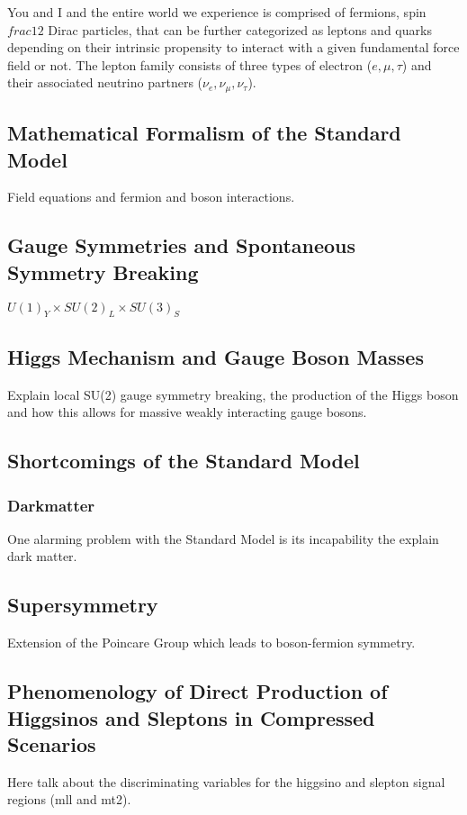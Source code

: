 \documentclass[11pt, oneside]{article}   	%
\begin{document}
You and I and the entire world we experience is comprised of fermions, spin $frac{1}{2}$ Dirac particles, that can be further categorized as leptons and quarks depending on their intrinsic propensity to interact with a given fundamental force field or not.  The lepton family consists of three types of electron ($e, \mu, \tau$) and their associated neutrino partners ($\nu_e, \nu_\mu, \nu_\tau$).

\subsection{Mathematical Formalism of the Standard Model}
\label{sec:theory2}
Field equations and fermion and boson interactions.

\subsection{Gauge Symmetries and Spontaneous Symmetry Breaking}
\label{sec:theory3}
$U(1)_{Y} \times SU(2)_{L} \times SU(3)_{S}$

\subsection{Higgs Mechanism and Gauge Boson Masses}
\label{sec:theory4}
Explain local SU(2) gauge symmetry breaking, the production of the Higgs boson and how this allows for massive weakly interacting gauge bosons.

\subsection{Shortcomings of the Standard Model}
\label{sec:theory5}
\subsubsection{Darkmatter}
One alarming problem with the Standard Model is its incapability the explain dark matter.

\subsection{Supersymmetry}
\label{sec:theory6}
Extension of the Poincare Group which leads to boson-fermion symmetry.

\subsection{Phenomenology of Direct Production of Higgsinos and Sleptons in Compressed Scenarios}
Here talk about the discriminating variables for the higgsino and slepton signal regions (mll and mt2).
\end{document}
